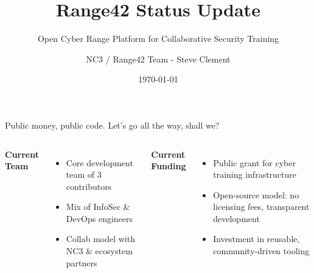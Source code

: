 \documentclass[aspectratio=169]{beamer}
\title{\faIcon{shield-alt}\; Range42 Status Update}
\subtitle{Open Cyber Range Platform for Collaborative Security Training}
\author{NC3 / Range42 Team - Steve Clement}
\date{\today}
\institute{\faServer\; Proxmox \quad \faCogs\; Ansible \quad \faProjectDiagram\; Orchestration \quad \faBinoculars\; Telemetry}
\begin{document}
\begin{frame}
  \titlepage
\end{frame}



\begin{frame}[shrink=8]{Public money, public code. Let's go all the way, shall we?}
  \begin{columns}[T]
    \textbf{Current Team}
    \begin{itemize}
      \item Core development team of 3 contributors
      \item Mix of InfoSec \& DevOps engineers
      \item Collab model with NC3 \& ecosystem partners
    \end{itemize}
    
    \textbf{Current Funding}
    \begin{itemize}
      \item Public grant for cyber training infrastructure
      \item Open-source model: no licensing fees, transparent development
      \item Investment in reusable, community-driven tooling
    \end{itemize}
    

\end{columns}
\end{frame}
\end{document}
